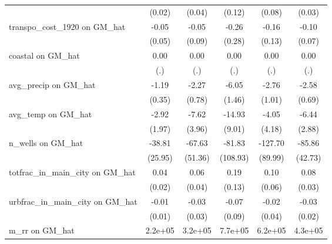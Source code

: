 \begin{table}[htbp]
\begin{tabular}{l*{5}{c}}
                &   (0.02)         &   (0.04)         &   (0.12)         &   (0.08)         &   (0.03)         \\
\addlinespace
transpo\_cost\_1920 on GM\_hat&    -0.05         &    -0.05         &    -0.26         &    -0.16         &    -0.10         \\
                &   (0.05)         &   (0.09)         &   (0.28)         &   (0.13)         &   (0.07)         \\
\addlinespace
coastal on GM\_hat&     0.00         &     0.00         &     0.00         &     0.00         &     0.00         \\
                &      (.)         &      (.)         &      (.)         &      (.)         &      (.)         \\
\addlinespace
avg\_precip on GM\_hat&    -1.19\sym{***}&    -2.27\sym{**} &    -6.05\sym{***}&    -2.76\sym{**} &    -2.58\sym{***}\\
                &   (0.35)         &   (0.78)         &   (1.46)         &   (1.01)         &   (0.69)         \\
\addlinespace
avg\_temp on GM\_hat&    -2.92         &    -7.62         &   -14.93         &    -4.05         &    -6.44\sym{*}  \\
                &   (1.97)         &   (3.96)         &   (9.01)         &   (4.18)         &   (2.88)         \\
\addlinespace
n\_wells on GM\_hat&   -38.81         &   -67.63         &   -81.83         &  -127.70         &   -85.86\sym{*}  \\
                &  (25.95)         &  (51.36)         & (108.93)         &  (89.99)         &  (42.73)         \\
\addlinespace
totfrac\_in\_main\_city on GM\_hat&     0.04         &     0.06         &     0.19         &     0.10         &     0.08\sym{*}  \\
                &   (0.02)         &   (0.04)         &   (0.13)         &   (0.06)         &   (0.03)         \\
\addlinespace
urbfrac\_in\_main\_city on GM\_hat&    -0.01         &    -0.03         &    -0.07         &    -0.02         &    -0.03         \\
                &   (0.01)         &   (0.03)         &   (0.09)         &   (0.04)         &   (0.02)         \\
\addlinespace
m\_rr on GM\_hat  &  2.2e+05\sym{*}  &  3.2e+05         &  7.7e+05         &  6.2e+05\sym{**} &  4.3e+05\sym{**} \\

\end{tabular}
\end{table}
